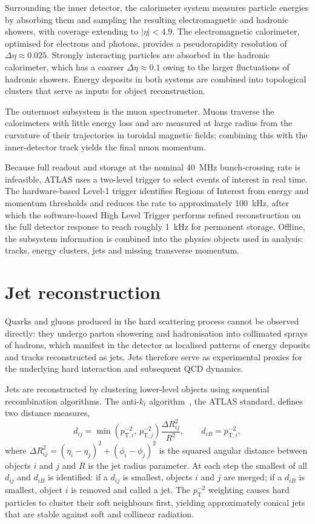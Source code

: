 Surrounding the inner detector, the calorimeter system measures particle energies by absorbing them and sampling the resulting electromagnetic and hadronic showers, with coverage extending to $|\eta| < 4.9$. The electromagnetic calorimeter, optimised for electrons and photons, provides a pseudorapidity resolution of $\Delta\eta \approx 0.025$. Strongly interacting particles are absorbed in the hadronic calorimeter, which has a coarser $\Delta\eta \approx 0.1$ owing to the larger fluctuations of hadronic showers. Energy deposits in both systems are combined into topological clusters that serve as inputs for object reconstruction.

The outermost subsystem is the muon spectrometer. Muons traverse the calorimeters with little energy loss and are measured at large radius from the curvature of their trajectories in toroidal magnetic fields; combining this with the inner-detector track yields the final muon momentum.

Because full readout and storage at the nominal 40~MHz bunch-crossing rate is infeasible, ATLAS uses a two-level trigger to select events of interest in real time. The hardware-based Level-1 trigger identifies Regions of Interest from energy and momentum thresholds and reduces the rate to approximately 100~kHz, after which the software-based High Level Trigger performs refined reconstruction on the full detector response to reach roughly 1~kHz for permanent storage. Offline, the subsystem information is combined into the physics objects used in analysis: tracks, energy clusters, jets and missing transverse momentum.

\section{Jet reconstruction}
Quarks and gluons produced in the hard scattering process cannot be observed directly: they undergo parton showering and hadronisation into collimated sprays of hadrons, which manifest in the detector as localised patterns of energy deposits and tracks reconstructed as jets. Jets therefore serve as experimental proxies for the underlying hard interaction and subsequent QCD dynamics.

Jets are reconstructed by clustering lower-level objects using sequential recombination algorithms. The anti-$k_t$ algorithm~\cite{Cacciari:2008gp}, the ATLAS standard, defines two distance measures,
\begin{equation}
    d_{ij} = \min\!\left(p_{\mathrm{T},i}^{-2},\, p_{\mathrm{T},j}^{-2}\right) \frac{\Delta R_{ij}^2}{R^2}, \qquad d_{iB} = p_{\mathrm{T},i}^{-2},
\end{equation}
where $\Delta R_{ij}^2 = (\eta_i - \eta_j)^2 + (\phi_i - \phi_j)^2$ is the squared angular distance between objects $i$ and $j$ and $R$ is the jet radius parameter. At each step the smallest of all $d_{ij}$ and $d_{iB}$ is identified: if a $d_{ij}$ is smallest, objects $i$ and $j$ are merged; if a $d_{iB}$ is smallest, object $i$ is removed and called a jet. The $p_{\mathrm{T}}^{-2}$ weighting causes hard particles to cluster their soft neighbours first, yielding approximately conical jets that are stable against soft and collinear radiation.

